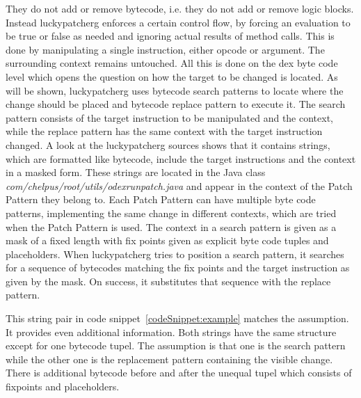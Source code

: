 They do not add or remove bytecode, i.e. they do not add or remove logic blocks. Instead \gls{luckypatcherg} enforces a certain control flow, by forcing an evaluation to be true or false as needed and ignoring actual results of method calls. This is done by manipulating a single instruction, either opcode or argument. The surrounding context remains untouched.
\newline
All this is done on the dex byte code level which opens the question on how the target to be changed is located. As will be shown,  \gls{luckypatcherg} uses bytecode search patterns to locate where the change should be placed and bytecode replace pattern to execute it.
\newline
The search pattern consists of the target instruction to be manipulated and the context, while the replace pattern has the same context with the target instruction changed. A look at the \gls{luckypatcherg} sources shows that it contains strings, which are formatted like bytecode, include the target instructions and the context in a masked form. These strings are located in the Java class \textit{com/chelpus/root/utils/odexrunpatch.java} and appear in the context of the Patch Pattern they belong to. Each Patch Pattern can have multiple byte code patterns, implementing the same change in different contexts, which are tried when the Patch Pattern is used.
\newline
The context in a search pattern is given as a mask of a fixed length with fix points given as explicit byte code tuples and placeholders. When \gls{luckypatcherg} tries to position a search pattern, it searches for a sequence of bytecodes matching the fix points and the target instruction as given by the mask. On success, it substitutes that sequence with the replace pattern.
\newline

This string pair in code snippet~\ref{codeSnippet:example} matches the assumption.
It provides even additional information.
Both strings have the same structure except for one bytecode tupel.
The assumption is that one is the search pattern while the other one is the replacement pattern containing the visible change.
There is additional bytecode before and after the unequal tupel which consists of fixpoints and placeholders.
\newline
